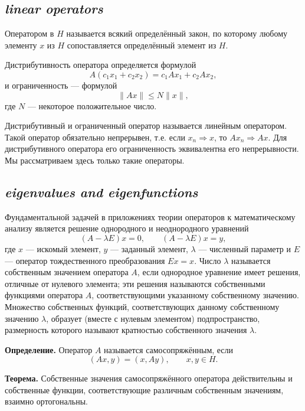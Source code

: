 \subsection*{ \textit{linear operators}}
\begin{rusblock}
Оператором в $H$ называется всякий определённый закон, по которому любому элементу $x$ из $H$ сопоставляется определённый элемент из $H$.

Дистрибутивность оператора определяется формулой
\[
A(c_1x_1+c_2x_2)=c_1Ax_1+c_2Ax_2,
\]
и ограниченность --- формулой
\[
\|Ax\|\le N\|x\|,
\]
где $N$ --- некоторое положительное число.

Дистрибутивный и ограниченный оператор называется линейным оператором. Такой оператор обязательно непрерывен, т.е. если $x_n\Rightarrow x$, то $Ax_n\Rightarrow Ax$. Для дистрибутивного оператора его ограниченность эквивалентна его непрерывности. Мы рассматриваем здесь только такие операторы.
\end{rusblock}

\subsection*{ \textit{eigenvalues and eigenfunctions}}
\begin{rusblock}
Фундаментальной задачей в приложениях теории операторов к математическому анализу является решение однородного и неоднородного уравнений
\[
(A-\lambda E)x=0,\qquad (A-\lambda E)x=y,
\]
где $x$ --- искомый элемент, $y$ --- заданный элемент, $\lambda$ --- численный параметр и $E$ --- оператор тождественного преобразования $Ex=x$. Число $\lambda$ называется собственным значением оператора $A$, если однородное уравнение имеет решения, отличные от нулевого элемента; эти решения называются собственными функциями оператора $A$, соответствующими указанному собственному значению. Множество собственных функций, соответствующих данному собственному значению $\lambda$, образует (вместе с нулевым элементом) подпространство, размерность которого называют кратностью собственного значения $\lambda$.

\textbf{Определение.} Оператор $A$ называется самосопряжённым, если
\[
(Ax,y)=(x,Ay),\qquad x,y\in H.
\]

\textbf{Теорема.} Собственные значения самосопряжённого оператора действительны и собственные функции, соответствующие различным собственным значениям, взаимно ортогональны.
\end{rusblock}

